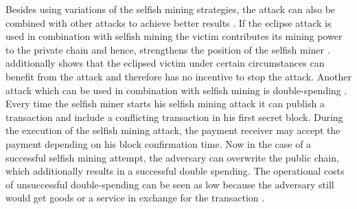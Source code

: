 Besides using variations of the selfish mining strategies, the attack can also be combined with other attacks to achieve better results \cite{gervais2016security, sapirshtein2016optimal, nayak2016stubborn, gervais2015tampering}.
If the eclipse attack is used in combination with selfish mining the victim contributes its mining power to the private chain and hence, strengthens the position of the selfish miner \cite{nayak2016stubborn, gervais2016security}.
\cite{nayak2016stubborn} additionally shows that the eclipsed victim under certain circumstances can benefit from the attack and therefore has no incentive to stop the attack.
Another attack which can be used in combination with selfish mining is double-spending \cite{sapirshtein2016optimal, gervais2016security}.
Every time the selfish miner starts his selfish mining attack it can publish a transaction and include a conflicting transaction in his first secret block.
During the execution of the selfish mining attack, the payment receiver may accept the payment depending on his block confirmation time.
Now in the case of a successful selfish mining attempt, the adversary can overwrite the public chain, which additionally results in a successful double spending.
The operational costs of unsuccessful double-spending can be seen as low because the adversary still would get goods or a service in exchange for the transaction \cite{sapirshtein2016optimal, gervais2016security}.

